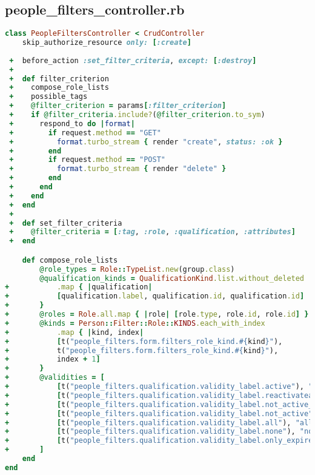 \subsection{people\_filters\_controller.rb}
\begin{lstlisting}[language=Ruby]
class PeopleFiltersController < CrudController
    skip_authorize_resource only: [:create]
  
 +  before_action :set_filter_criteria, except: [:destroy]
 +
 +  def filter_criterion
 +    compose_role_lists
 +    possible_tags
 +    @filter_criterion = params[:filter_criterion]
 +    if @filter_criteria.include?(@filter_criterion.to_sym)
 +      respond_to do |format|
 +        if request.method == "GET"
 +          format.turbo_stream { render "create", status: :ok }
 +        end
 +        if request.method == "POST"
 +          format.turbo_stream { render "delete" }
 +        end
 +      end
 +    end
 +  end
 +
 +  def set_filter_criteria
 +    @filter_criteria = [:tag, :role, :qualification, :attributes]
 +  end

    def compose_role_lists
        @role_types = Role::TypeList.new(group.class)
        @qualification_kinds = QualificationKind.list.without_deleted
+           .map { |qualification|
+           [qualification.label, qualification.id, qualification.id]
+       }
+       @roles = Role.all.map { |role| [role.type, role.id, role.id] }
+       @kinds = Person::Filter::Role::KINDS.each_with_index
+           .map { |kind, index|
+           [t("people_filters.form.filters_role_kind.#{kind}"),
+           t("people_filters.form.filters_role_kind.#{kind}"),
+           index + 1]
+       }
+       @validities = [
+           [t("people_filters.qualification.validity_label.active"), "active", 1],
+           [t("people_filters.qualification.validity_label.reactivateable"), "reactivateable", 2],
+           [t("people_filters.qualification.validity_label.not_active_but_reactivateable"), "not_active_but_reactivateable", 3],
+           [t("people_filters.qualification.validity_label.not_active"), "not_active", 4],
+           [t("people_filters.qualification.validity_label.all"), "all", 5],
+           [t("people_filters.qualification.validity_label.none"), "none", 6],
+           [t("people_filters.qualification.validity_label.only_expired"), "only_expired", 7]
+       ]
    end
end    
\end{lstlisting}

\newpage


